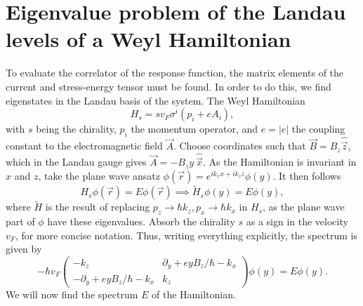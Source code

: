 \section{Eigenvalue problem of the Landau levels of a Weyl Hamiltonian}
To evaluate the correlator of the response function, the matrix elements of the current and stress-energy tensor must be found.
In order to do this, we find eigenstates in the Landau basis of the system.
The Weyl Hamiltonian
\begin{equation}
  \label{eq:99weyl-hamil}
  H_s = s v_F \sigma^i \left( p_i + e A_i \right),
\end{equation}
with $s$ being the chirality, $p_i$ the momentum operator, and $e = |e|$ the coupling constant to the electromagnetic field $\vec{A}$.
Choose coordinates such that $\vec{B} = B_z \hat{\vec{z}}$, which in the Landau gauge gives $\vec{A} = -B_{z}y \: \hat{\vec{x}}$.
As the Hamiltonian is invariant in $x$ and $z$, take the plane wave ansatz $\phi(\vec{r}) = e^{ik_x x + i k_z z} \phi (y)$.
It then follows
\begin{equation}
  H_s \phi(\vec{r}) = E \phi(\vec{r}) \implies \tilde{H}_s \phi(y)  = E \phi(y),
\end{equation}
where $\tilde{H}$ is the result of replacing $p_z \to \hbar k_z, p_x\to \hbar  k_x$ in $H_s$, as the plane wave part of $\phi $ have these eigenvalues.
Absorb the chirality $s$ as a sign in the velocity $v_F$, for more concise notation. 
Thus, writing everything explicitly, the spectrum is given by
\begin{equation}
  \label{eq:4}
  -\hbar  v_F
  \begin{pmatrix}
    - k_z & \partial _y + e y B_{z} / \hbar  - k_x\\
    -\partial _y + e y B_{z} / \hbar -k_x & k_z
  \end{pmatrix}
  \phi(y)  = E\phi(y).
\end{equation}
We will now find the spectrum $E$ of the Hamiltonian.

